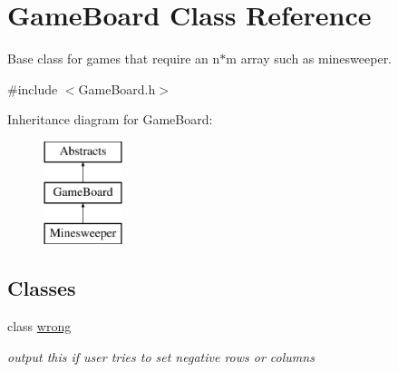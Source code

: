 \hypertarget{class_game_board}{}\section{Game\+Board Class Reference}
\label{class_game_board}


Base class for games that require an n$\ast$m array such as minesweeper.  




{\ttfamily \#include $<$Game\+Board.\+h$>$}

Inheritance diagram for Game\+Board\+:\begin{figure}[H]
\begin{center}
\leavevmode
\includegraphics[height=3.000000cm]{class_game_board}
\end{center}
\end{figure}
\subsection*{Classes}
\begin{DoxyCompactItemize}
\item 
class \hyperlink{class_game_board_1_1wrong}{wrong}
\begin{DoxyCompactList}\small\item\em output this if user tries to set negative rows or columns \end{DoxyCompactList}\end{DoxyCompactItemize}
